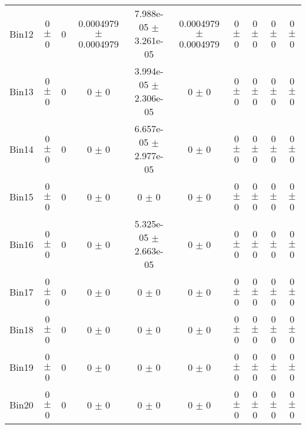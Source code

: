 \begin{tabular}{@{\extracolsep{4pt}}lccccccccc@{}}
     Bin12 & 0 $\pm$ 0 & 0 & 0.0004979 $\pm$ 0.0004979 & 7.988e-05 $\pm$ 3.261e-05 & 0.0004979 $\pm$ 0.0004979 & 0 $\pm$ 0 & 0 $\pm$ 0 & 0 $\pm$ 0 & 0 $\pm$ 0 \\ 
     Bin13 & 0 $\pm$ 0 & 0 & 0 $\pm$ 0 & 3.994e-05 $\pm$ 2.306e-05 & 0 $\pm$ 0 & 0 $\pm$ 0 & 0 $\pm$ 0 & 0 $\pm$ 0 & 0 $\pm$ 0 \\ 
     Bin14 & 0 $\pm$ 0 & 0 & 0 $\pm$ 0 & 6.657e-05 $\pm$ 2.977e-05 & 0 $\pm$ 0 & 0 $\pm$ 0 & 0 $\pm$ 0 & 0 $\pm$ 0 & 0 $\pm$ 0 \\ 
     Bin15 & 0 $\pm$ 0 & 0 & 0 $\pm$ 0 & 0 $\pm$ 0 & 0 $\pm$ 0 & 0 $\pm$ 0 & 0 $\pm$ 0 & 0 $\pm$ 0 & 0 $\pm$ 0 \\ 
     Bin16 & 0 $\pm$ 0 & 0 & 0 $\pm$ 0 & 5.325e-05 $\pm$ 2.663e-05 & 0 $\pm$ 0 & 0 $\pm$ 0 & 0 $\pm$ 0 & 0 $\pm$ 0 & 0 $\pm$ 0 \\ 
     Bin17 & 0 $\pm$ 0 & 0 & 0 $\pm$ 0 & 0 $\pm$ 0 & 0 $\pm$ 0 & 0 $\pm$ 0 & 0 $\pm$ 0 & 0 $\pm$ 0 & 0 $\pm$ 0 \\ 
     Bin18 & 0 $\pm$ 0 & 0 & 0 $\pm$ 0 & 0 $\pm$ 0 & 0 $\pm$ 0 & 0 $\pm$ 0 & 0 $\pm$ 0 & 0 $\pm$ 0 & 0 $\pm$ 0 \\ 
     Bin19 & 0 $\pm$ 0 & 0 & 0 $\pm$ 0 & 0 $\pm$ 0 & 0 $\pm$ 0 & 0 $\pm$ 0 & 0 $\pm$ 0 & 0 $\pm$ 0 & 0 $\pm$ 0 \\ 
     Bin20 & 0 $\pm$ 0 & 0 & 0 $\pm$ 0 & 0 $\pm$ 0 & 0 $\pm$ 0 & 0 $\pm$ 0 & 0 $\pm$ 0 & 0 $\pm$ 0 & 0 $\pm$ 0 \\ 
\hline\hline
  \end{tabular}
